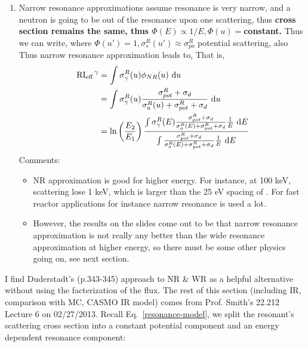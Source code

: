 \documentclass{school-22.211-notes}
\begin{document}
\begin{enumerate}
\item Narrow resonance approximations assume resonance is very narrow, and a neutron is going to be out of the resonance upon one scattering, thus \textbf{cross section remains the same, thus $\Phi(E) \propto 1/E, \Phi(u) = $constant.} Thus we can write, 
where $\Phi(u') = 1, \sigma_{s}^R (u')\approx \sigma_{po}^R$ potential scattering, also 
Thus narrow resonance approximation leads to, 
That is, 
\begin{align}
\left. \mathrm{RI}_{\mathrm{eff}} \right.^{\gamma} &= \int \sigma_{\gamma}^R (u) \phi_{NR} (u) \mbox{ }\mathrm{d} u \\
&= \int \sigma_{\gamma}^R (u) \frac{\sigma_{pot}^R + \sigma_d}{\sigma_a^R(u) + \sigma_{pot}^R + \sigma_d} \mbox{ }\mathrm{d} u \\
&= \ln\left( \frac{E_2}{E_1} \right) \frac{ \int \sigma_{\gamma}^R (E) \frac{\sigma_{pot}^R + \sigma_d}{\sigma_{a}^R(E) + \sigma_{pot}^R + \sigma_d} \frac{1}{E} \mbox{ }\mathrm{d} E}{ \int \frac{\sigma_{pot}^R + \sigma_d}{\sigma_{a}^R(E) + \sigma_{pot}^R + \sigma_d} \frac{1}{E} \mbox{ }\mathrm{d} E}
\end{align}
Comments:
\begin{itemize}
\item NR approximation is good for higher energy. For instance, at 100 keV, scattering lose 1 keV, which is larger than the 25 eV spacing of . For fast reactor applications for instance narrow resonance is used a lot. 

\item However, the results on the slides come out to be that narrow resonance approximation is not really any better than the wide resonance approximation at higher energy, so there must be some other physics going on, see next section. 
\end{itemize}
\end{enumerate}


\clearpage
{} 
I find Duderstadt's (p.343-345) approach to NR \& WR as a helpful alternative without using the facterization of the flux. The rest of this section (including IR, comparison with MC, CASMO IR model) comes from Prof. Smith's 22.212 Lecture 6 on 02/27/2013. Recall Eq.~\ref{resonance-model}, we split the resonant's scattering cross section into a constant potential component and an energy dependent resonance component: 
\end{document}
